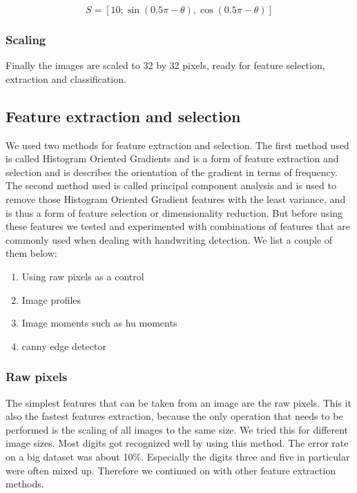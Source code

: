 \documentclass[%
        compressed,
        final,
        notitlepage,
        narroweqnarray,
        inline,
        twoside,
        ]{ieee}
\begin{document}
\begin{equation}
    S=[1 0; \sin(0.5 \pi - \theta),\cos(0.5 \pi - \theta)]
\end{equation}

\subsubsection{Scaling}
Finally the images are scaled to 32 by 32 pixels, ready for feature selection, extraction and classification.
\subsection{Feature extraction and selection}
We used two methods for feature extraction and selection. The first method used is called Histogram Oriented Gradients and is a form of feature extraction and selection and is describes the orientation of the gradient in terms of frequency. The second method used is called principal component analysis and is used to remove those Histogram Oriented Gradient features with the least variance, and is thus a form of feature selection or dimensionality reduction. But before using these features we tested and experimented with combinations of features that are commonly used when dealing with handwriting detection. We list a couple of them below:

    \begin{enumerate}
        \item Using raw pixels as a control
        \item Image profiles
        \item Image moments such as hu moments
        \item canny edge detector
    \end{enumerate}


    \subsubsection{Raw pixels}
The simplest features that can be taken from an image are the raw pixels. This
it also the fastest features extraction, because the only operation that needs
to be performed is the scaling of all images to the same size. We tried this for
different image sizes. Most digits got recognized well by using this method. The
error rate on a big dataset was about 10\%. Especially the digits three and five in particular were often mixed up. Therefore we continued on with other feature extraction methods.
\end{document}
